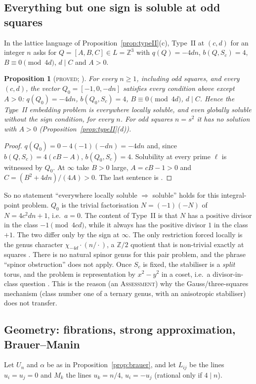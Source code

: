 \documentclass[10pt,reqno]{amsart}
\newtheorem{proposition}[theorem]{Proposition}
\theoremstyle{definition}
\numberwithin{equation}{section}
\newcommand{\Z}{\mathbb Z}
\newcommand{\status}[1]{\textup{\textsc{#1}}}
\begin{document}
\subsection{Everything but one sign is soluble at odd squares}
In the lattice language of Proposition~\ref{prop:typeII}(c), Type~II at
$(c,d)$ for an integer $n$ asks for $Q=[A,B,C]\in L=\Z^3$ with
$q(Q)=-4dn$, $b(Q,S_c)=4$, $B\equiv0\pmod{4d}$, $d\mid C$ and $A>0$.

\begin{proposition}[\status{proved}; {\cite[Prop.~8.3]{O128}}]\label{prop:locsq}
For every $n\ge1$, including odd squares, and every $(c,d)$, the vector
$Q_0=[-1,0,-dn]$ satisfies every condition above except $A>0$:
$q(Q_0)=-4dn$, $b(Q_0,S_c)=4$, $B\equiv0\pmod{4d}$, $d\mid C$. Hence the
Type~II embedding problem is everywhere locally soluble, and even globally
soluble without the sign condition, for every $n$. For odd squares
$n=s^2$ it has no solution with $A>0$ (Proposition~\ref{prop:typeII}(d)).
\end{proposition}
\begin{proof}
$q(Q_0)=0-4(-1)(-dn)=-4dn$ and, since $b(Q,S_c)=4(cB-A)$,
$b(Q_0,S_c)=4$. Solubility at every prime $\ell$ is witnessed by $Q_0$. At
$\infty$ take $B>0$ large, $A=cB-1>0$ and $C=(B^2+4dn)/(4A)>0$. The last
sentence is \cite[Prop.~1.6]{ET}.
\end{proof}
So no statement ``everywhere locally soluble $\Rightarrow$ soluble'' holds
for this integral-point problem. $Q_0$ is the trivial factorisation
$N=(-1)(-N)$ of $N=4c^2dn+1$, i.e.\ $a=0$. The content of Type~II is that
$N$ has a positive divisor in the class $-1\pmod{4cd}$, while it always has
the positive divisor $1$ in the class $+1$. The two differ only by the sign
at $\infty$. The only restriction forced locally is the genus character
$\chi_{-4d}\cdot(n/\cdot)$, a $\Z/2$ quotient that is non-trivial exactly
at squares \cite[Prop.~9.2]{O128}. There is no natural spinor genus for
this pair problem, and the phrase ``spinor obstruction'' does not apply.
Once $S_c$ is fixed, the stabiliser is a \emph{split} torus, and the
problem is representation by $x^2-y^2$ in a coset, i.e.\ a
divisor-in-class question \cite[\S8]{O128}. This is the reason (an
\status{Assessment}) why the Gauss/three-squares mechanism (class number
one of a ternary genus, with an anisotropic stabiliser) does not transfer.

\subsection{Geometry: fibrations, strong approximation, Brauer--Manin}
Let $U_n$ and $\alpha$ be as in Proposition~\ref{prop:brauer}, and let
$L_{ij}$ be the lines $u_i=u_j=0$ and $M_k$ the lines $u_k=n/4$,
$u_i=-u_j$ (rational only if $4\mid n$).
\end{document}
